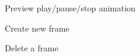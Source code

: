 \documentclass[11pt]{article} %
\begin{document}
\begin{figure}[H]
	\centering
	\caption{Preview play/pause/stop animation}
	\label{fig:UC8}
\end{figure}

\begin{figure}[H]
	\centering
	\caption{Create new frame}
	\label{fig:UC9}
\end{figure}

\begin{figure}[H]
	\centering
	\caption{Delete a frame}
	\label{fig:UC10}
\end{figure}
\end{document}
